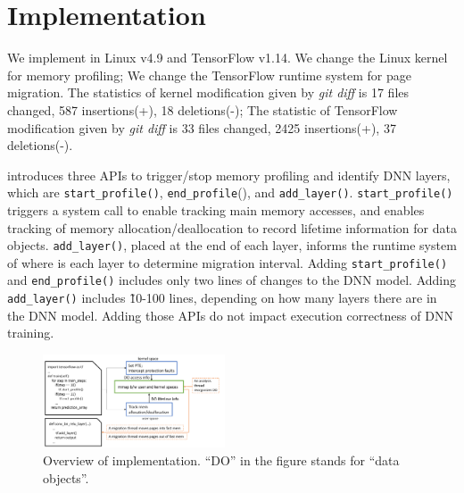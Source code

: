 \section{Implementation}
\label{sec:impl}

We implement \name in Linux v4.9 and TensorFlow v1.14. We change the Linux kernel for memory profiling; We change the TensorFlow runtime system for page migration. The statistics of kernel modification given by \textit{git diff} is 17 files changed, 587 insertions(+), 18 deletions(-); The statistic of TensorFlow modification given by \textit{git diff} is 33 files changed, 2425 insertions(+), 37 deletions(-).

\name introduces three APIs to trigger/stop memory profiling and identify DNN layers, which are \texttt{start\_profile()}, \texttt{end\_profile}(), and \texttt{add\_layer()}. \texttt{start\_profile()} triggers a system call to enable tracking main memory accesses, and enables tracking of memory allocation/deallocation to record lifetime information for data objects. \texttt{add\_layer()}, placed at the end of each layer, informs the runtime system of where is each layer to determine migration interval. Adding \texttt{start\_profile()} and \texttt{end\_profile()} includes only two lines of changes to the DNN model. Adding \texttt{add\_layer()} includes \~10-100 lines, depending on how many layers there are in the DNN model. Adding those APIs do not impact execution correctness of DNN training. 





\begin{figure}
\centering
\includegraphics[width=0.48\textwidth]{figures/impl.pdf}
\vspace{-15pt}
\caption{Overview of \name implementation. ``DO'' in the figure stands for ``data objects''.}
\vspace{-5pt}
\label{fig:impl}
\end{figure}

